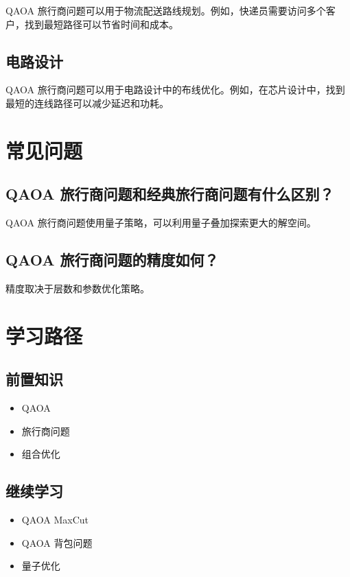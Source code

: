 \documentclass[12pt,a4paper]{article}
\begin{document}
QAOA 旅行商问题可以用于物流配送路线规划。例如，快递员需要访问多个客户，找到最短路径可以节省时间和成本。

\subsection{电路设计}

QAOA 旅行商问题可以用于电路设计中的布线优化。例如，在芯片设计中，找到最短的连线路径可以减少延迟和功耗。

\section{常见问题}

\subsection{QAOA 旅行商问题和经典旅行商问题有什么区别？}

QAOA 旅行商问题使用量子策略，可以利用量子叠加探索更大的解空间。

\subsection{QAOA 旅行商问题的精度如何？}

精度取决于层数和参数优化策略。

\section{学习路径}

\subsection{前置知识}
\begin{itemize}
  \item QAOA
  \item 旅行商问题
  \item 组合优化
\end{itemize}

\subsection{继续学习}
\begin{itemize}
  \item QAOA MaxCut
  \item QAOA 背包问题
  \item 量子优化
\end{itemize}
\end{document}
